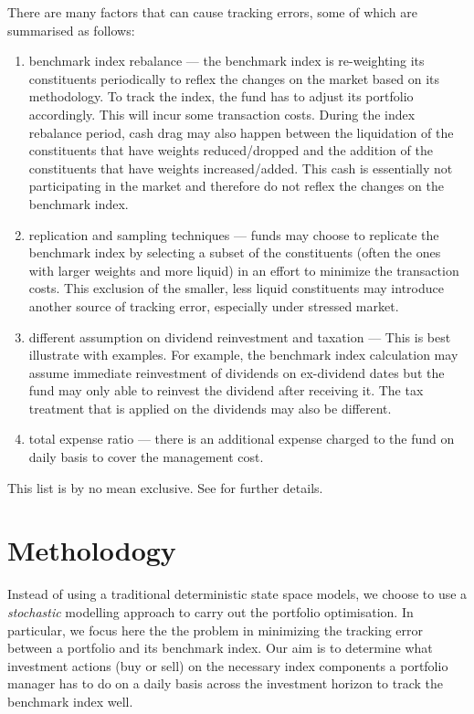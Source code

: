 There are many factors that can cause tracking errors, some of which are summarised as follows:
\begin{enumerate}
\item benchmark index rebalance --- the benchmark index is re-weighting its constituents periodically to reflex the changes on the market based on its methodology. To track the index, the fund has to adjust its portfolio accordingly. This will incur some transaction costs. During the index rebalance period, cash drag may also  happen between the liquidation of the constituents that have weights reduced/dropped and the addition of the constituents that have weights increased/added. This cash is essentially not participating in the market and therefore do not reflex the changes on the benchmark index.
\item replication and sampling techniques --- funds may choose to replicate the benchmark index by selecting a subset of the constituents (often the ones with larger weights and more liquid) in an effort to minimize the transaction costs. This exclusion of the smaller, less liquid constituents may introduce another source of tracking error, especially under stressed market.
\item different assumption on dividend reinvestment and taxation --- This is best illustrate with examples. For example, the benchmark index calculation may assume immediate reinvestment of dividends on ex-dividend dates but the fund may only able to reinvest the dividend after receiving it. The tax treatment that is applied on the dividends may also be different.
\item total expense ratio --- there is an additional expense charged to the fund on daily basis to cover the management cost.
\end{enumerate}
This list is by no mean exclusive. See \cite{BJ13} for further details.
 
\section{Metholodogy}
Instead of using a traditional deterministic state space models, we choose to use a \emph{stochastic} modelling approach to carry out the portfolio optimisation. In particular, we focus here the the problem in minimizing the tracking error between a portfolio and its benchmark index.  Our aim is to determine what investment actions (buy or sell) on the necessary index components a portfolio manager has to do on a daily basis across the investment horizon to track the benchmark index well.

